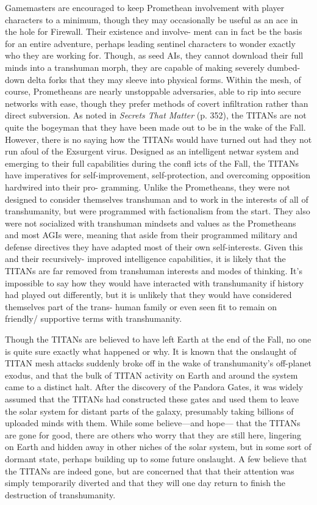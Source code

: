 Gamemasters are encouraged to keep Promethean 
involvement with player characters to a minimum, 
though they may occasionally be useful as an ace in 
the hole for Firewall. Their existence and involve-
ment can in fact be the basis for an entire adventure, 
perhaps leading sentinel characters to wonder exactly 
who they are working for. Though, as seed AIs, they 
cannot download their full minds into a transhuman 
morph, they are capable of making severely dumbed-
down delta forks that they may sleeve into physical 
forms. Within the mesh, of course, Prometheans are 
nearly unstoppable adversaries, able to rip into secure 
networks with ease, though they prefer methods of 
covert infiltration rather than direct subversion.
As noted in \textit{Secrets That Matter} (p. 352), the TITANs 
are not quite the bogeyman that they have been made 
out to be in the wake of the Fall. However, there is no 
saying how the TITANs would have turned out had 
they not run afoul of the Exsurgent virus. Designed as 
an intelligent netwar system and emerging to their full 
capabilities during the confl icts of the Fall, the TITANs 
have imperatives for self-improvement, self-protection, 
and overcoming opposition hardwired into their pro-
gramming. Unlike the Prometheans, they were not 
designed to consider themselves transhuman and to 
work in the interests of all of transhumanity, but were 
programmed with factionalism from the start. They 
also were not socialized with transhuman mindsets 
and values as the Prometheans and most AGIs were, 
meaning that aside from their programmed military 
and defense directives they have adapted most of their 
own self-interests. Given this and their recursively-
improved intelligence capabilities, it is likely that the 
TITANs are far removed from transhuman interests 
and modes of thinking. It's impossible to say how they 
would have interacted with transhumanity if history 
had played out differently, but it is unlikely that they 
would have considered themselves part of the trans-
human family or even seen fit to remain on friendly/
supportive terms with transhumanity.

Though the TITANs are believed to have left Earth 
at the end of the Fall, no one is quite sure exactly 
what happened or why. It is known that the onslaught 
of TITAN mesh attacks suddenly broke off in the 
wake of transhumanity's off-planet exodus, and that 
the bulk of TITAN activity on Earth and around the 
system came to a distinct halt. After the discovery 
of the Pandora Gates, it was widely assumed that 
the TITANs had constructed these gates and used 
them to leave the solar system for distant parts of 
the galaxy, presumably taking billions of uploaded 
minds with them. While some believe—and hope—
that the TITANs are gone for good, there are others 
who worry that they are still here, lingering on Earth 
and hidden away in other niches of the solar system, 
but in some sort of dormant state, perhaps building 
up to some future onslaught. A few believe that the 
TITANs are indeed gone, but are concerned that that 
their attention was simply temporarily diverted and 
that they will one day return to finish the destruction 
of transhumanity. 

